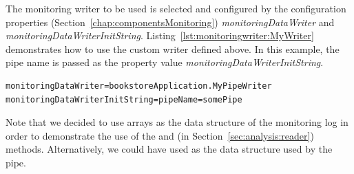 \noindent The monitoring writer to be used is selected and configured by the \KiekerMonitoringPart{} %
configuration properties (Section~\ref{chap:componentsMonitoring}) %
\textit{monitoringDataWriter} and \textit{monitoringDataWriterInitString}. %
Listing~\ref{lst:monitoringwriter:MyWriter} demonstrates how to use the custom %
writer  defined above. In this example, the pipe name is %
passed as the property value \textit{monitoringDataWriterInitString}.

\setBashListing       
\begin{lstlisting}[label=lst:monitoringwriter:MyWriter]
monitoringDataWriter=bookstoreApplication.MyPipeWriter
monitoringDataWriterInitString=pipeName=somePipe
\end{lstlisting}

\enlargethispage{1cm}

\noindent Note that we decided to use  arrays as the data structure of the %
monitoring log in order to demonstrate the use of the  and %
 (in Section~\ref{sec:analysis:reader}) methods. %
Alternatively, we could have used  as the data structure %
used by the pipe. %